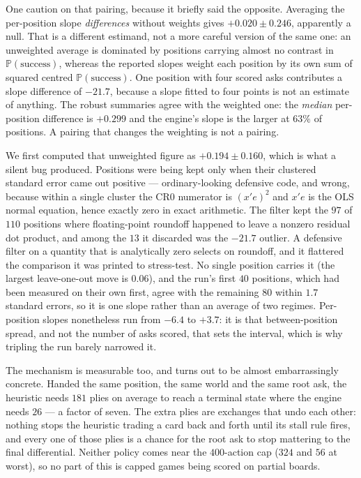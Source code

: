\documentclass[11pt,a4paper]{article}
\newcommand{\Prob}{\ensuremath{\mathbb{P}}}
\begin{document}
One caution on that pairing, because it briefly said the opposite. Averaging the
per-position slope \emph{differences} without weights gives
$+0.020 \pm 0.246$, apparently a null. That is a different estimand, not a more
careful version of the same one: an unweighted average is dominated by positions
carrying almost no contrast in $\Prob(\text{success})$, whereas the reported
slopes weight each position by its own sum of squared centred
$\Prob(\text{success})$. One position with four scored asks contributes a slope
difference of $-21.7$, because a slope fitted to four points is not an estimate
of anything. The robust summaries agree with the weighted one: the \emph{median}
per-position difference is $+0.299$ and the engine's slope is the larger at
$63\%$ of positions. A pairing that changes the weighting is not a pairing.

We first computed that unweighted figure as $+0.194 \pm 0.160$, which is what a
silent bug produced. Positions were being kept only when their clustered
standard error came out positive --- ordinary-looking defensive code, and wrong,
because within a single cluster the CR0 numerator is $(x'e)^2$ and $x'e$ is the
OLS normal equation, hence exactly zero in exact arithmetic. The filter kept the
$97$ of $110$ positions where floating-point roundoff happened to leave a
nonzero residual dot product, and among the $13$ it discarded was the $-21.7$
outlier. A defensive filter on a quantity that is analytically zero selects on
roundoff, and it flattered the comparison it was printed to stress-test. No single position carries it (the largest leave-one-out move
is $0.06$), and the run's first $40$ positions, which had been measured on their
own first, agree with the remaining $80$ within $1.7$ standard errors, so it is
one slope rather than an average of two regimes. Per-position slopes nonetheless
run from $-6.4$ to $+3.7$: it is that between-position spread, and not the
number of asks scored, that sets the interval, which is why tripling the run
barely narrowed it.

The mechanism is measurable too, and turns out to be almost embarrassingly
concrete. Handed the same position, the same world and the same root ask, the
heuristic needs $181$ plies on average to reach a terminal state where the
engine needs $26$ --- a factor of seven. The extra plies are exchanges that undo
each other: nothing stops the heuristic trading a card back and forth until its
stall rule fires, and every one of those plies is a chance for the root ask to
stop mattering to the final differential. Neither policy comes near the
$400$-action cap ($324$ and $56$ at worst), so no part of this is capped games
being scored on partial boards.
\end{document}
